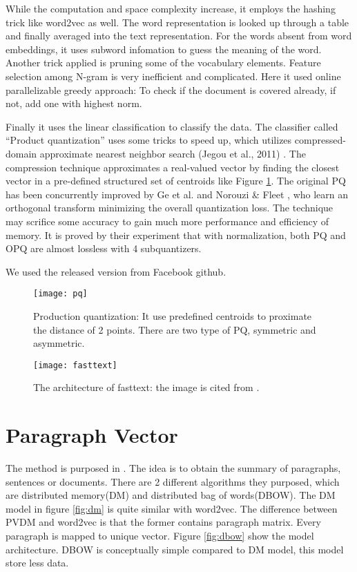 While the computation and space complexity increase, it employs the hashing trick like word2vec as well. 
The word representation is looked up through a table and finally averaged into the text representation. 
For the words absent from word embeddings, it uses subword infomation\cite{bojanowski2016enriching} to guess the meaning of the word.
Another trick applied is pruning some of the vocabulary elements. Feature selection among N-gram is very inefficient and complicated.
Here it used online parallelizable greedy approach: To check if the document is covered already, if not, add one with highest norm.

Finally it uses the linear classification to classify the data. The classifier called \enquote{Product quantization} uses some tricks to speed up, which utilizes compressed-domain approximate nearest neighbor search (Jegou et al., 2011) \cite{jegou2011searching}.
The compression technique approximates a real-valued vector by finding the closest vector in a pre-defined structured set of centroids like Figure \ref{fig:pq}.
The original PQ has been concurrently improved by Ge et al. \cite{ge2013optimized} and Norouzi \& Fleet , who learn an orthogonal transform minimizing the overall quantization loss.
The technique may scrifice some accuracy to gain much more performance and efficiency of memory. It is proved by their experiment that with normalization, both PQ and OPQ are almost lossless with 4 subquantizers. 

We used the released version from Facebook github.

\begin{figure}[h]
    \centering
	\texttt{[image: pq]}
    \caption{Production quantization: It use predefined centroids to proximate the distance of 2 points. There are two type of PQ, symmetric and asymmetric. }
    \label{fig:pq}
\end{figure}

\begin{figure}[h]
    \centering
	\texttt{[image: fasttext]}
    \caption{The architecture of fasttext: the image is cited from \cite{joulin2016fasttext}.}
    \label{fig:fasttext}
\end{figure}


\section{Paragraph Vector}
	
The method is purposed in \cite{PVDM}. The idea is to obtain the summary of paragraphs, sentences or documents. 
There are 2 different algorithms they purposed, which are distributed memory(DM) and distributed bag of words(DBOW). 
The DM model in figure \ref{fig:dm} is quite similar with word2vec. The difference between PVDM and word2vec is that the former contains paragraph matrix.
Every paragraph is mapped to unique vector. Figure \ref{fig:dbow} show the model architecture. DBOW is conceptually simple compared to DM model, this model store less data. 

